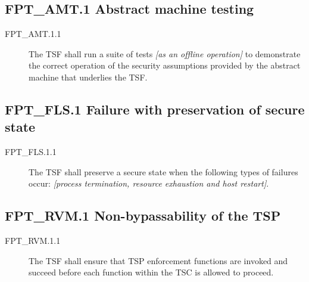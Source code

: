 \documentclass[10pt,a4paper,english]{scrbook}
\begin{document}
\subsection{FPT{\_}AMT.1 Abstract machine testing}
\begin{description}
\item[FPT{\_}AMT.1.1 ]

The TSF shall run a suite of tests \emph{{[}as an offline
operation]} to demonstrate the correct operation of the security
assumptions provided by the abstract machine that underlies the
TSF.

\end{description}



\hypertarget{fpt-fls-1-failure-with-preservation-of-secure-state}{}
\subsection{FPT{\_}FLS.1 Failure with preservation of secure state}
\begin{description}
\item[FPT{\_}FLS.1.1 ]

The TSF shall preserve a secure state when the following types of
failures occur: \emph{{[}process termination, resource
exhaustion and host restart]}.

\end{description}



\hypertarget{fpt-rvm-1-non-bypassability-of-the-tsp}{}
\subsection{FPT{\_}RVM.1 Non-bypassability of the TSP}
\begin{description}
\item[FPT{\_}RVM.1.1 ]

The TSF shall ensure that TSP enforcement functions are invoked
and succeed before each function within the TSC is allowed to
proceed.

\end{description}
\end{document}
